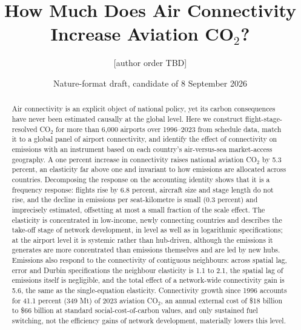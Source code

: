 \documentclass[12pt]{article}
\title{How Much Does Air Connectivity Increase Aviation CO$_2$?}
\author{[author order TBD]}
\date{Nature-format draft, candidate of 8 September 2026}
\begin{document}
\maketitle

\begin{abstract}
\noindent Air connectivity is an explicit object of national policy, yet its
carbon consequences have never been estimated causally at the global level.
Here we construct flight-stage-resolved CO$_2$ for more than 6{,}000
airports over 1996--2023 from schedule data, match it to a global panel of
airport connectivity, and identify the effect of connectivity on emissions
with an instrument based on each country's air-versus-sea market-access
geography. A one percent increase in connectivity raises national aviation
CO$_2$ by 5.3 percent, an elasticity far above one and invariant to how
emissions are allocated across countries. Decomposing the response on the
accounting identity shows that it is a frequency response: flights rise by
6.8 percent, aircraft size and stage length do not rise, and the decline in
emissions per seat-kilometre is small (0.3 percent) and imprecisely
estimated, offsetting at most a small fraction of the scale effect. 
The elasticity is concentrated in low-income, newly connecting
countries and describes the take-off stage of network development, in
level as well as in logarithmic specifications; at the airport level it is systemic rather than hub-driven,
although the emissions it generates are more concentrated than emissions
themselves and are led by new hubs. Emissions also respond to the
connectivity of contiguous neighbours: across spatial lag, error and Durbin
specifications the neighbour elasticity is 1.1 to 2.1, the spatial lag of
emissions itself is negligible, and the total effect of a network-wide
connectivity gain is 5.6, the same as the single-equation elasticity. Connectivity growth since
1996 accounts for 41.1 percent (349 Mt) of 2023 aviation CO$_2$, an annual
external cost of \$18 billion to \$66 billion at standard social-cost-of-carbon
values, and only sustained fuel switching, not the efficiency gains of
network development, materially lowers this level.
\end{abstract}

\end{document}
